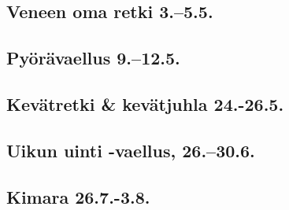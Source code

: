 \documentclass[10pt,finnish,a5paper,headings=small,twoside=semi]{scrartcl}
\begin{document}
\subsection{Veneen oma retki 3.–5.5.}
\subsection{Pyörävaellus 9.–12.5.}
\subsection{Kevätretki \& kevätjuhla 24.-26.5.}
\subsection{Uikun uinti -vaellus, 26.–30.6.}
\subsection{Kimara 26.7.-3.8.}



\clearpage

\thispagestyle{empty}~

\vfill


{
	\noindent
	\centering
	\begin{center}
	\end{center}
}
\end{document}
